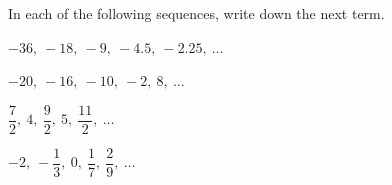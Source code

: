  In each of the following sequences, write down the next term.

\begin{subparts}
  \item $-36,\ -18,\ -9,\ -4.5,\ -2.25,\ \ldots$
  \item $-20,\ -16,\ -10,\ -2,\ 8,\ \ldots$
  \item $\dfrac{7}{2},\ 4,\ \dfrac{9}{2},\ 5,\ \dfrac{11}{2},\ \ldots$
  \item $-2,\ -\dfrac{1}{3},\ 0,\ \dfrac{1}{7},\ \dfrac{2}{9},\ \ldots$
\end{subparts}

